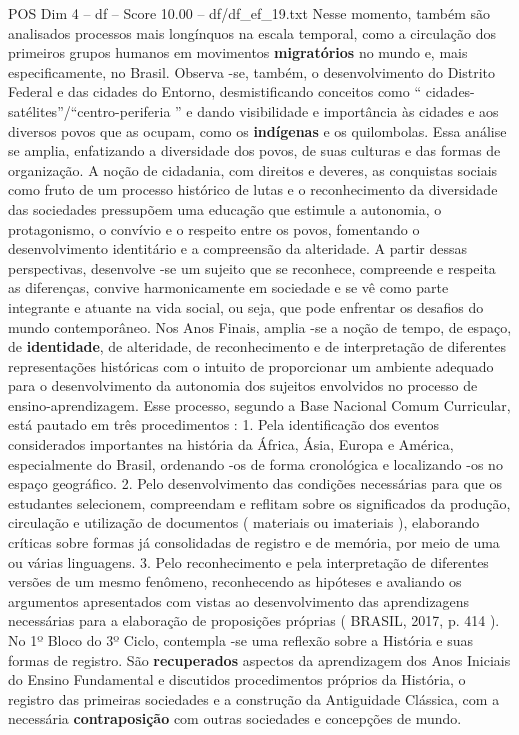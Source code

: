 \begin{textsample}{POS Dim 4 – df – Score 10.00 – df/df\_ef\_19.txt}
Nesse momento, também são analisados processos mais longínquos na escala temporal, como a circulação dos primeiros grupos humanos em movimentos \textbf{migratórios} no mundo e, mais especificamente, no Brasil.
Observa -se, também, o desenvolvimento do Distrito Federal e das cidades do Entorno, desmistificando conceitos como “ cidades-satélites”/“centro-periferia ” e dando visibilidade e importância às cidades e aos diversos povos que as ocupam, como os \textbf{indígenas} e os quilombolas.
Essa análise se amplia, enfatizando a diversidade dos povos, de suas culturas e das formas de organização.
A noção de cidadania, com direitos e deveres, as conquistas sociais como fruto de um processo histórico de lutas e o reconhecimento da diversidade das sociedades pressupõem uma educação que estimule a autonomia, o protagonismo, o convívio e o respeito entre os povos, fomentando o desenvolvimento identitário e a compreensão da alteridade.
A partir dessas perspectivas, desenvolve -se um sujeito que se reconhece, compreende e respeita as diferenças, convive harmonicamente em sociedade e se vê como parte integrante e atuante na vida social, ou seja, que pode enfrentar os desafios do mundo contemporâneo.
Nos Anos Finais, amplia -se a noção de tempo, de espaço, de \textbf{identidade}, de alteridade, de reconhecimento e de interpretação de diferentes representações históricas com o intuito de proporcionar um ambiente adequado para o desenvolvimento da autonomia dos sujeitos envolvidos no processo de ensino-aprendizagem.
Esse processo, segundo a Base Nacional Comum Curricular, está pautado em três procedimentos : 1.
Pela identificação dos eventos considerados importantes na história da África, Ásia, Europa e América, especialmente do Brasil, ordenando -os de forma cronológica e localizando -os no espaço geográfico. 2.
Pelo desenvolvimento das condições necessárias para que os estudantes selecionem, compreendam e reflitam sobre os significados da produção, circulação e utilização de documentos ( materiais ou imateriais ), elaborando críticas sobre formas já consolidadas de registro e de memória, por meio de uma ou várias linguagens. 3.
Pelo reconhecimento e pela interpretação de diferentes versões de um mesmo fenômeno, reconhecendo as hipóteses e avaliando os argumentos apresentados com vistas ao desenvolvimento das aprendizagens necessárias para a elaboração de proposições próprias ( BRASIL, 2017, p. 414 ).
No 1º Bloco do 3º Ciclo, contempla -se uma reflexão sobre a História e suas formas de registro.
São \textbf{recuperados} aspectos da aprendizagem dos Anos Iniciais do Ensino Fundamental e discutidos procedimentos próprios da História, o registro das primeiras sociedades e a construção da Antiguidade Clássica, com a necessária \textbf{contraposição} com outras sociedades e concepções de mundo.

\end{textsample}
